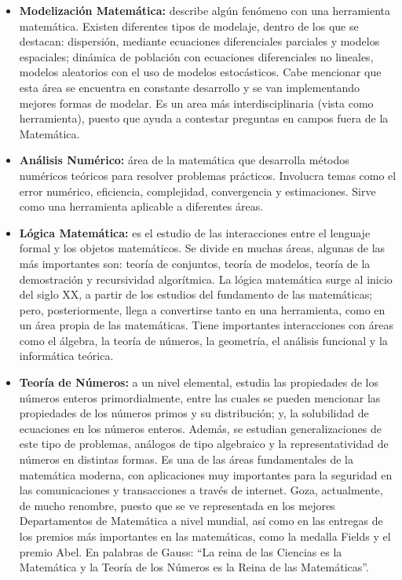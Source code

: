 \begin{itemize}
    \color{blue} \item \color{black} \textbf{Modelización Matemática:} describe algún fenómeno con una herramienta matemática. Existen diferentes tipos de modelaje, dentro de los que se destacan: dispersión, mediante ecuaciones diferenciales parciales y modelos espaciales; dinámica de población con ecuaciones diferenciales no lineales, modelos aleatorios con el uso de modelos estocásticos. Cabe mencionar que esta área se encuentra en constante desarrollo y se van implementando mejores formas de modelar. Es un area más interdisciplinaria (vista como herramienta), puesto que ayuda a contestar preguntas en campos fuera de la Matemática.
    
     \color{blue} \item \color{black} \textbf{Análisis Numérico:} área de la matemática que desarrolla métodos numéricos teóricos para resolver problemas prácticos. Involucra temas como el error numérico, eficiencia, complejidad, convergencia y estimaciones. Sirve como una herramienta aplicable a diferentes áreas.
     
    \color{blue} \item \color{black} \textbf{Lógica Matemática:} es el estudio de las interacciones entre el lenguaje formal y los objetos matemáticos.  Se divide en muchas áreas, algunas de las más importantes son: teoría de conjuntos, teoría de modelos, teoría de la demostración y recursividad algorítmica. La lógica matemática surge al inicio del siglo XX, a partir de los estudios del fundamento de las matemáticas; pero, posteriormente, llega a convertirse tanto en una herramienta, como en un área propia de las matemáticas. Tiene importantes interacciones con áreas como el álgebra, la teoría de números, la geometría, el análisis funcional y la informática teórica.
    
     \color{blue} \item \color{black} \textbf{Teoría de Números:} a un nivel elemental, estudia las propiedades de los números enteros primordialmente, entre las cuales se pueden mencionar las propiedades de los números primos y su distribución; y, la solubilidad de ecuaciones en los números enteros. Además, se estudian generalizaciones de este tipo de problemas, análogos de tipo algebraico y la representatividad de números en distintas formas. Es una de las áreas fundamentales de la matemática moderna, con aplicaciones muy importantes para la seguridad en las comunicaciones y transacciones a través de internet. Goza, actualmente, de mucho renombre, puesto que se ve representada en los mejores Departamentos de Matemática a nivel mundial, así como en las entregas de los premios más importantes en las matemáticas, como la medalla Fields y el premio Abel. En palabras de Gauss: “La reina de las Ciencias es la Matemática y la Teoría de los Números es la Reina de las Matemáticas”. 
     

\end{itemize}
